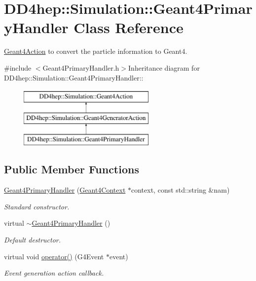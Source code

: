 \hypertarget{class_d_d4hep_1_1_simulation_1_1_geant4_primary_handler}{
\section{DD4hep::Simulation::Geant4PrimaryHandler Class Reference}
\label{class_d_d4hep_1_1_simulation_1_1_geant4_primary_handler}
}


\hyperlink{class_d_d4hep_1_1_simulation_1_1_geant4_action}{Geant4Action} to convert the particle information to Geant4.  


{\ttfamily \#include $<$Geant4PrimaryHandler.h$>$}Inheritance diagram for DD4hep::Simulation::Geant4PrimaryHandler::\begin{figure}[H]
\begin{center}
\leavevmode
\includegraphics[height=3cm]{class_d_d4hep_1_1_simulation_1_1_geant4_primary_handler}
\end{center}
\end{figure}
\subsection*{Public Member Functions}
\begin{DoxyCompactItemize}
\item 
\hyperlink{class_d_d4hep_1_1_simulation_1_1_geant4_primary_handler_abc9c6880682a0ade66bdb15774e67180}{Geant4PrimaryHandler} (\hyperlink{class_d_d4hep_1_1_simulation_1_1_geant4_context}{Geant4Context} $\ast$context, const std::string \&nam)
\begin{DoxyCompactList}\small\item\em Standard constructor. \item\end{DoxyCompactList}\item 
virtual \hyperlink{class_d_d4hep_1_1_simulation_1_1_geant4_primary_handler_aa559ec3b18b6663b07914aba80760212}{$\sim$Geant4PrimaryHandler} ()
\begin{DoxyCompactList}\small\item\em Default destructor. \item\end{DoxyCompactList}\item 
virtual void \hyperlink{class_d_d4hep_1_1_simulation_1_1_geant4_primary_handler_a54370e4749de14a101a248981f51864b}{operator()} (G4Event $\ast$event)
\begin{DoxyCompactList}\small\item\em Event generation action callback. \item\end{DoxyCompactList}\end{DoxyCompactItemize}


